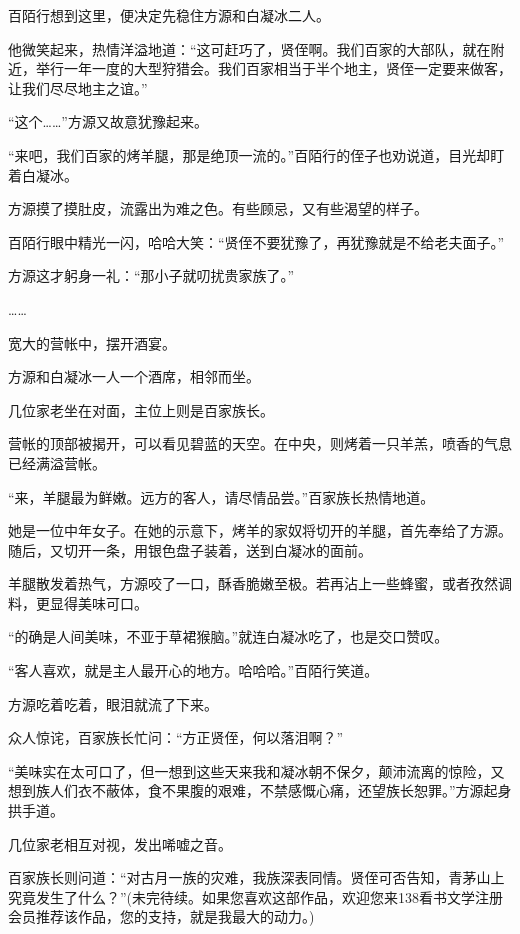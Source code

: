 \begin{this_body}
百陌行想到这里，便决定先稳住方源和白凝冰二人。

他微笑起来，热情洋溢地道：“这可赶巧了，贤侄啊。我们百家的大部队，就在附近，举行一年一度的大型狩猎会。我们百家相当于半个地主，贤侄一定要来做客，让我们尽尽地主之谊。”

“这个……”方源又故意犹豫起来。

“来吧，我们百家的烤羊腿，那是绝顶一流的。”百陌行的侄子也劝说道，目光却盯着白凝冰。

方源摸了摸肚皮，流露出为难之色。有些顾忌，又有些渴望的样子。

百陌行眼中精光一闪，哈哈大笑：“贤侄不要犹豫了，再犹豫就是不给老夫面子。”

方源这才躬身一礼：“那小子就叨扰贵家族了。”

……

宽大的营帐中，摆开酒宴。

方源和白凝冰一人一个酒席，相邻而坐。

几位家老坐在对面，主位上则是百家族长。

营帐的顶部被揭开，可以看见碧蓝的天空。在中央，则烤着一只羊羔，喷香的气息已经满溢营帐。

“来，羊腿最为鲜嫩。远方的客人，请尽情品尝。”百家族长热情地道。

她是一位中年女子。在她的示意下，烤羊的家奴将切开的羊腿，首先奉给了方源。随后，又切开一条，用银色盘子装着，送到白凝冰的面前。

羊腿散发着热气，方源咬了一口，酥香脆嫩至极。若再沾上一些蜂蜜，或者孜然调料，更显得美味可口。

“的确是人间美味，不亚于草裙猴脑。”就连白凝冰吃了，也是交口赞叹。

“客人喜欢，就是主人最开心的地方。哈哈哈。”百陌行笑道。

方源吃着吃着，眼泪就流了下来。

众人惊诧，百家族长忙问：“方正贤侄，何以落泪啊？”

“美味实在太可口了，但一想到这些天来我和凝冰朝不保夕，颠沛流离的惊险，又想到族人们衣不蔽体，食不果腹的艰难，不禁感慨心痛，还望族长恕罪。”方源起身拱手道。

几位家老相互对视，发出唏嘘之音。

百家族长则问道：“对古月一族的灾难，我族深表同情。贤侄可否告知，青茅山上究竟发生了什么？”(未完待续。如果您喜欢这部作品，欢迎您来138看书文学注册会员推荐该作品，您的支持，就是我最大的动力。)

\end{this_body}

